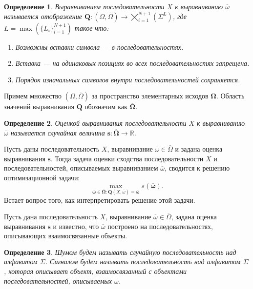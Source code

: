 \documentclass[specialist,
substylefile = spbu_report.rtx,
subf,href,colorlinks=true, 12pt]{disser}
\newtheorem{defenition}{Определение}
\begin{document}
		\begin{defenition}
			Выравниванием последовательности $X$ к выравниванию $\overline \omega$ называется отображение $\boldsymbol{Q}: (\Omega, \overline{\Omega}) \rightarrow \bigtimes_{i=1}^{N+1}(\Sigma^{L})$, где $L = \max(\{L_i\}_{i=1}^{N+1})$ такое что:
			\begin{enumerate}
				\item Возможны вставки символа --- в последовательностях.
				\item Вставка --- на одинаковых позициях во всех последовательностях запрещена.
				\item Порядок изначальных символов внутри последовательностей сохраняется.
			\end{enumerate}
		\end{defenition}
		
		Примем множество $(\Omega, \overline \Omega)$ за пространство элементарных исходов $\boldsymbol{\Omega}$. Область значений выравнивания $\boldsymbol Q$ обозначим как $\overline{\boldsymbol{\Omega}}$.
		
		\begin{defenition}				
			Оценкой выравнивания последовательности $X$ к выравниванию $\overline \omega$ называется случайная величина $\boldsymbol s:\overline{\boldsymbol{\Omega}} \rightarrow \mathbb{R}$.
		\end{defenition}
	
		Пусть даны последовательность $X$, выравнивание $\overline{\omega} \in \overline{\Omega}$ и задана оценка выравнивания $\boldsymbol{s}$. Тогда задача оценки сходства последовательности $X$ и последовательностей, описываемых выравниванием $\overline{\omega}$, сводится к решению оптимизационной задачи:		
		\begin{equation*}
			\max_{\overline{\boldsymbol{\omega}} \in \overline{\boldsymbol{\Omega}} : \boldsymbol{Q}(X, \overline{\omega}) = \overline{\boldsymbol{\omega}}}s(\overline{\boldsymbol{\omega}}). \label{eq:2}
		\end{equation*}		
		Встает вопрос того, как интерпретировать решение этой задачи. 
		
		Пусть дана последовательность $X$, выравнивание $\overline{\omega} \in \overline{\Omega}$, задана оценка выравнивания $\boldsymbol{s}$ и известно, что $\overline{\omega}$ построено на последовательностях, описывающих взаимосвязанные объекты.
		\begin{defenition}
			Шумом будем называть случайную последовательность над алфавитом $\Sigma$. Сигналом будем называть последовательность над алфавитом $\Sigma$, которая описывает объект, взаимосвязанный с объектами последовательностей, описываемых $\overline{\omega}$.
		\end{defenition}
		
\end{document}
